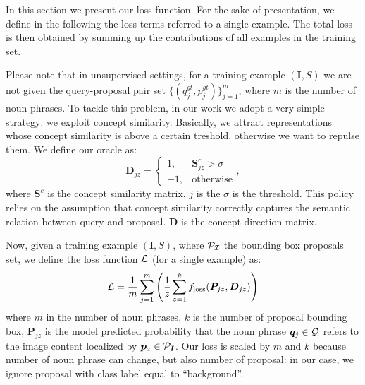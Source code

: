 \documentclass{article}
\begin{document}
In this section we present our loss function. For the sake of
presentation, we define in the following the loss terms referred to a
single example. The total loss is then obtained by summing up the
contributions of all examples in the training set.

Please note that in unsupervised settings, for a training example
$\left( \bm{I}, S \right)$ we are not given the query-proposal pair
set $\{ ( q^{gt}_j, p^{gt}_j ) \}^m_{j=1}$, where $m$ is the number of
noun phrases.
To tackle this problem, in our work we adopt a very simple strategy:
we exploit concept similarity. Basically, we attract representations
whose concept similarity is above a certain treshold, otherwise we
want to repulse them. We define our oracle as:
\begin{equation}
  \bm{D}_{jz} =
  \begin{cases}
    1, & \bm{S}^c_{jz} > \sigma \\
    -1, & \text{otherwise}
  \end{cases},
\end{equation}
where $\bm{S}^c$ is the concept similarity matrix, $j$ is the  $\sigma$ is the
threshold. This policy relies on the assumption that concept
similarity correctly captures the semantic relation between query and
proposal. $\bm{D}$ is the concept direction matrix.

Now, given a training example $\left( \bm{I}, S \right)$, where
$\cal{P}_{\bm{I}}$ the bounding box proposals set, we define the loss
function $\mathcal{L}$ (for a single example) as:
\begin{equation}
  \mathcal{L} = \frac{1}{m} \sum^m_{j=1} \Bigg( \frac{1}{z} \sum^k_{z=1} f_{\text{loss}} ( \bm{P}_{jz}, \bm{D}_{jz} ) \Bigg)
\end{equation}
where $m$ in the number of noun phrases, $k$ is the number of proposal
bounding box, $\bm{P}_{jz}$ is the model predicted probability that
the noun phrase $\bm{q}_j \in \mathcal{Q}$ refers to the image content
localized by $\bm{p}_z \in \mathcal{P}_{\bm{I}}$. Our loss is scaled by $m$
and $k$ because number of noun phrase can change, but also number of
proposal: in our case, we ignore proposal with class label equal to
``background''. 
\end{document}
